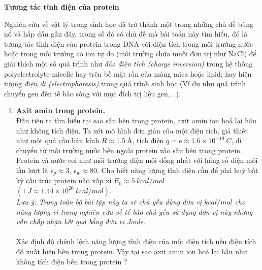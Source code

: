 
\textbf{Tương tác tĩnh điện của protein}

Nghiên cứu về vật lý trong sinh học đã trở thành một trong những chủ đề bùng nổ và hấp dẫn gần đây, trong số đó có chủ đề mà bài toán này tìm hiểu, đó là tương tác tĩnh điện của protein trong DNA với điện tích trong môi trường nước hoặc trong môi trường có ion tự do (môi trường chứa muối đơn trị như NaCl) để giải thích một số quá trình như \textit{đảo điện tích (charge inversion)} trong hệ thống polyelectrolyte-micelle hay trên bề mặt rắn của màng mica hoặc lipid; hay hiện tượng \textit{điện di (electrophoresis)} trong quá trình sinh học (Ví dụ như quá trình chuyển gen đến tế bào sống với mục đích trị liệu gen,...).

\begin{enumerate}
    \item \textbf{Axit amin trong protein.} \\
    Đầu tiên ta tìm hiểu tại sao sâu bên trong protein, axit amin ion hoá lại hầu như không tích điện. Ta xét mô hình đơn giản của một điện tích, giả thiết như một quả cầu bán kính $R\approx 1.5\ \si{\angstrom}$, tích điện $q=\text{e}\approx 1.6 \times 10^{-19}\ \si{C} $, di chuyển từ môi trường nước bên ngoài protein vào sâu bên trong protein. Protein và nước coi như môi trường điện môi đồng nhất với hằng số điện môi lần lượt là $\epsilon_p \approx 3$, $\epsilon_w \approx 80$. Cho biết năng lượng tĩnh điện cần để phá huỷ bất kỳ cấu trúc protein nào xấp xỉ $E_0 \approx 5\ \si{kcal/mol}$ $(1\ \si{J} \approx 1.44 \times 10^{20}\ \si{kcal/mol})$.\\ \textit{Lưu ý: Trong toàn bộ bài tập này ta sẽ chủ yếu dùng đơn vị $\si{kcal/mol}$ cho năng lượng vì trong nghiên cứu về tế bào chủ yếu sử dụng đơn vị này nhưng vẫn chấp nhận kết quả bằng đơn vị Joule.}\\ \\
    Xác định độ chênh lệch năng lượng tĩnh điện của một điện tích nếu điện tích đó xuất hiện bên trong protein. Vậy tại sao axit amin ion hoá lại hầu như không tích điện bên trong protein ?


\end{enumerate}
